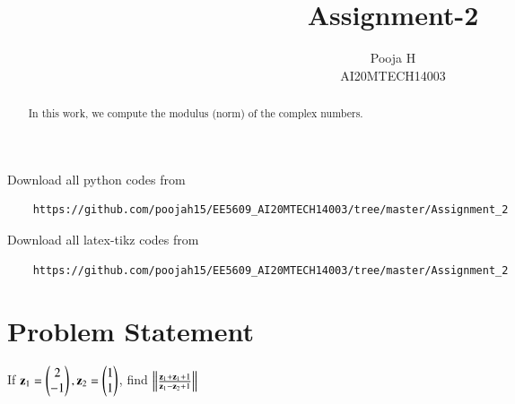 \documentclass[journal,12pt,twocolumn]{IEEEtran}
\begin{document}
	\makeatother
	\let\StandardTheFigure\thefigure
	\let\vec\mathbf
	\renewcommand{\thefigure}{\theproblem}
	\def\putbox#1#2#3{\makebox[0in][l]{\makebox[#1][l]{}\raisebox{\baselineskip}[0in][0in]{\raisebox{#2}[0in][0in]{#3}}}}
	\def\rightbox#1{\makebox[0in][r]{#1}}
	\def\centbox#1{\makebox[0in]{#1}}
	\def\topbox#1{\raisebox{-\baselineskip}[0in][0in]{#1}}
	\def\midbox#1{\raisebox{-0.5\baselineskip}[0in][0in]{#1}}
	\vspace{3cm}
	\title{Assignment-2}
	\author{Pooja H \\ AI20MTECH14003}
	\maketitle
	\newpage
	\bigskip
	\renewcommand{\thefigure}{\theenumi}
	\renewcommand{\thetable}{\theenumi}
	\begin{abstract}
		In this work, we compute the modulus (norm) of the complex numbers.
	\end{abstract}
	Download all python codes from 
	\begin{lstlisting}
	https://github.com/poojah15/EE5609_AI20MTECH14003/tree/master/Assignment_2
	\end{lstlisting}
	Download all latex-tikz codes from 
	\begin{lstlisting}
	https://github.com/poojah15/EE5609_AI20MTECH14003/tree/master/Assignment_2
	\end{lstlisting}
	\section{Problem Statement}
	If $\vec{z}_1 = \myvec{2 \\ -1}, \vec{z}_2 = \myvec{1 \\ 1}$, find $\norm{\frac{\vec{z}_1 + \vec{z}_1 + 1}{\vec{z}_1-\vec{z}_2+1}}$ 
\end{document}
